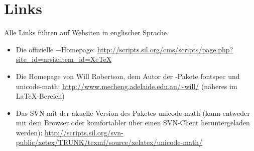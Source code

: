 ﻿\documentclass{scrartcl}
\begin{document}
\section{Links}
Alle Links führen auf Websiten in englischer Sprache.
\begin{itemize}
\item Die offizielle \XeTeX−Homepage: \url{http://scripts.sil.org/cms/scripts/page.php?site_id=nrsi&item_id=XeTeX}
\item Die Homepage von Will Robertson, dem Autor der \XeTeX-Pakete fontspec und unicode-math: \url{http://www.mecheng.adelaide.edu.au/~will/}  (näheres im \LaTeX-Bereich)
\item Das SVN mit der akuelle Version des Paketes unicode-math (kann entweder mit dem Browser oder komfortabler über einen SVN-Client heruntergeladen werden): \url{http://scripts.sil.org/svn-public/xetex/TRUNK/texmf/source/xelatex/unicode-math/}
\end{itemize}
\end{document}
